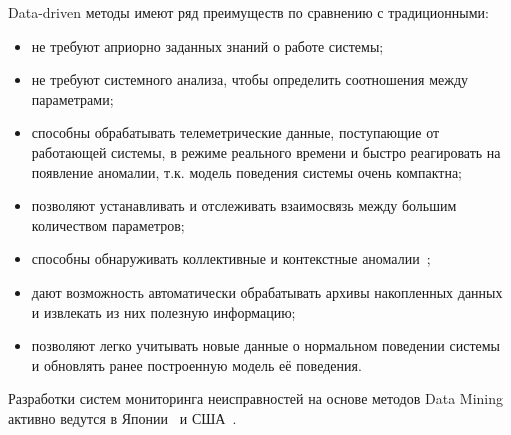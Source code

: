 Data-driven методы имеют ряд преимуществ по сравнению с традиционными:
\begin{itemize}
	\item не требуют априорно заданных знаний о работе системы;
	\item не требуют системного анализа, чтобы определить соотношения между параметрами;
	\item способны обрабатывать телеметрические данные, поступающие от работающей системы, в режиме реального времени и быстро реагировать на появление аномалии, т.к. модель поведения системы очень компактна;
	\item позволяют устанавливать и отслеживать взаимосвязь между большим количеством параметров;
	\item способны обнаруживать коллективные и контекстные аномалии~\cite{AnomalyDetectionASurvey};
	\item дают возможность автоматически обрабатывать архивы накопленных данных и извлекать из них полезную информацию;
	\item позволяют легко учитывать новые данные о нормальном поведении системы и обновлять ранее построенную модель её поведения.
\end{itemize}

\smallskip
Разработки систем мониторинга неисправностей на основе методов Data Mining активно ведутся в Японии~\cite{FaultDetectionByMiningAssocRules} и США~\cite{IversonGeneralPurposeDDSM, IversonISHM}.